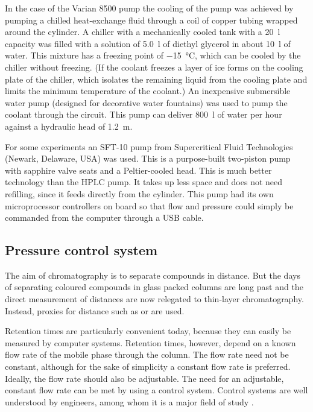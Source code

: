 In the case of the Varian 8500 pump the cooling of the pump was achieved by
pumping a chilled heat-exchange fluid through a coil of copper tubing wrapped
around the cylinder. A chiller with a mechanically cooled tank with a
\SI{20}{\litre} capacity was filled with a solution of \SI{5.0}{\litre} of
diethyl glycerol in about \SI{10}{\litre} of water. This mixture has a freezing
point of \SI{-15}{\celsius}, which can be cooled by the chiller without
freezing. (If the coolant freezes a layer of ice forms on the cooling plate of
the chiller, which isolates the remaining liquid from the cooling plate and
limits the minimum temperature of the coolant.) An inexpensive submersible water
pump (designed for decorative water fountains) was used to pump the coolant
through the circuit. This pump can deliver \SI{800}{\litre} of water per hour
against a hydraulic head of \SI{1.2}{\metre}.

For some experiments an SFT-10 pump from Supercritical Fluid Technologies
(Newark, Delaware, USA) was used. This is a purpose-built two-piston pump with
sapphire valve seats and a Peltier-cooled head. This is much better technology
than the HPLC pump. It takes up less space and does not need refilling, since it
feeds directly from the cylinder. This pump had its own microprocessor
controllers on board so that flow and pressure could simply be commanded from
the computer through a USB cable.

\subsection{Pressure control system}

The aim of chromatography is to separate compounds in distance.
But the days of separating coloured compounds in glass packed columns are long
past and the direct measurement of distances are now relegated to thin-layer
chromatography. Instead, proxies for distance such as  or  are used.



Retention times are particularly convenient today, because they can easily be
measured by computer systems. Retention times, however, depend on a known flow
rate of the mobile phase through the column. The flow rate need not be
constant, although for the sake of simplicity a constant flow rate is preferred.
Ideally, the flow rate should also be adjustable. The need for an adjustable,
constant flow rate can be met by using a control system. Control systems are
well understood by engineers, among whom it is a major field of study
\autocite{Koenig2009}.

